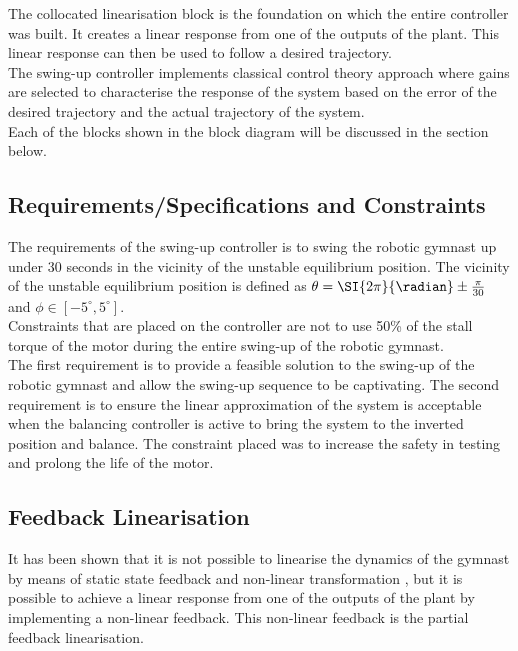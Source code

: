The collocated linearisation block is the foundation on which the entire controller was built. It creates a linear response from one of the outputs of the plant. This linear response can then be used to follow a desired trajectory.\\

The swing-up controller implements classical control theory approach where gains are selected to characterise the response of the system based on the error of the desired trajectory and the actual trajectory of the system.\\

Each of the blocks shown in the block diagram will be discussed in the section below.


\subsection{Requirements/Specifications and Constraints}
The requirements of the swing-up controller is to swing the robotic gymnast up under 30 seconds in the vicinity of the unstable equilibrium position. The vicinity of the unstable equilibrium position is defined as $\theta = \SI{2\pi}{\radian} \pm \frac{\pi}{30}$ and $\phi \in [-5^{\circ},5^{\circ}]$.\\

Constraints that are placed on the controller are not to use 50\% of the stall torque of the motor during the entire swing-up of the robotic gymnast.\\

The first requirement is to provide a feasible solution to the swing-up of the robotic gymnast and allow the swing-up sequence to be captivating. The second requirement is to ensure the linear approximation of the system is acceptable when the balancing controller is active to bring the system to the inverted position and balance. The constraint placed was to increase the safety in testing and prolong the life of the motor.\\

\subsection{Feedback Linearisation}
It has been shown that it is not possible to linearise the dynamics of the gymnast by means of static state feedback and non-linear transformation \citep{murray}, but it is possible to achieve a linear response from one of the outputs of the plant by implementing a non-linear feedback. This non-linear feedback is the partial feedback linearisation.\\

